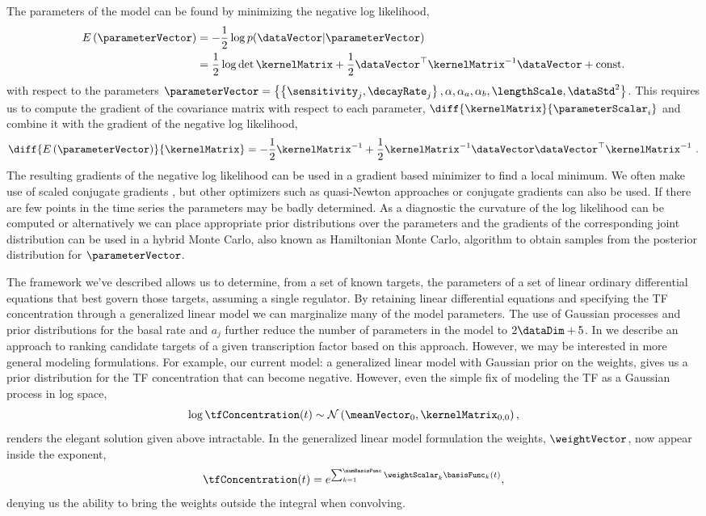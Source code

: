 \documentclass{article}
\begin{document}
The parameters of the model can be found by minimizing the negative log likelihood, 
\begin{align}
E\left(\parameterVector\right)& = -\frac{1}{2}\log p(\dataVector |
\parameterVector)\\ & = \frac{1}{2}\log \det{\kernelMatrix}  +
\frac{1}{2}\dataVector^\top\kernelMatrix^{-1}\dataVector +
\mathrm{const.}
\label{eq:error}
\end{align}
with respect to the parameters $\parameterVector =
\left\{\left\{\sensitivity_j, \decayRate_j\right\}, \alpha,
  \alpha_a, \alpha_b, \lengthScale, \dataStd^2 \right\}$. This
requires us to compute the gradient of the covariance matrix with
respect to each parameter, $\diff{\kernelMatrix}{\parameterScalar_i}$
and combine it with the gradient of the negative log likelihood,
\[
\diff{E\left(\parameterVector\right)}{\kernelMatrix} =
-\frac{1}{2}\kernelMatrix^{-1}  + \frac{1}{2}\kernelMatrix^{-1}
\dataVector\dataVector^\top\kernelMatrix^{-1} \ .
\]
The resulting gradients of the negative log likelihood can be used in
a gradient based minimizer to find a local minimum. We often make use
of scaled conjugate gradients \citep{Moller:scg93}, but other
optimizers such as quasi-Newton approaches \cite[see
e.g.][]{Zhu:lbfgsb97} or conjugate gradients can also be used. If
there are few points in the time series the parameters may be badly
determined. As a diagnostic the curvature of the log likelihood can be
computed or alternatively we can place appropriate prior distributions
over the parameters and the gradients of the corresponding joint
distribution can be used in a hybrid Monte Carlo, also known as
Hamiltonian Monte Carlo, algorithm \citep[see
e.g.][for details on hybrid Monte Carlo]{MacKay:information03} to obtain samples from the posterior
distribution for $\parameterVector$.

The framework we've described allows us to determine, from a set of
known targets, the parameters of a set of linear ordinary differential
equations that best govern those targets, assuming a single
regulator. By retaining linear differential equations and specifying
the TF concentration through a generalized linear model we can
marginalize many of the model parameters. The use of Gaussian
processes and prior distributions for the basal rate and $a_j$ further
reduce the number of parameters in the model to $2\dataDim + 5$. In
 we describe an approach to ranking
candidate targets of a given transcription factor based on this
approach. However, we may be interested in more general modeling
formulations. For example, our current model: a generalized linear
model with Gaussian prior on the weights, gives us a prior
distribution for the TF concentration that can become
negative. However, even the simple fix of modeling the TF as a
Gaussian process in log space,
\[
\log \tfConcentration(t) \sim \mathcal{N}\left(\meanVector_0, \kernelMatrix_{0,0}\right),
\]
renders the elegant solution given above intractable. In the
generalized linear model formulation the weights, $\weightVector$, now
appear inside the exponent,
\[
\tfConcentration(t)=e^{\sum_{k=1}^\numBasisFunc \weightScalar_k \basisFunc_k(t)},
\]
denying us the ability to bring the weights outside the integral when
convolving.
\end{document}
